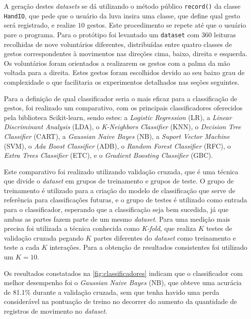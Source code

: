 A geração destes \textit{datasets} se dá utilizando o método público \texttt{record()} da classe \texttt{HandIO}, que pede que o usuário da luva insira uma classe, que define qual gesto será registrado, e realize $10$ gestos. Este procedimento se repete até que o usuário pare o programa. Para o protótipo foi levantado um \texttt{dataset} com $360$ leituras recolhidas de nove voluntários diferentes, distribuídas entre quatro classes de gestos correspondentes à movimentos nas direções cima, baixo, direita e esquerda. Os voluntários foram orientados a realizarem os gestos com a palma da mão voltada para a direita. Estes gestos foram escolhidos devido ao seu baixo grau de complexidade o que facilitaria os experimentos detalhados nas seções seguintes.

Para a definição de qual classificador seria o mais eficaz para a classificação de gestos, foi realizado um comparativo, com os principais classificadores oferecidos pela biblioteca Scikit-learn, sendo estes: a \textit{Logistic Regression} (LR), a \textit{Linear Discriminant Analysis} (LDA), o \textit{K-Neighbors Classifier} (KNN), o \textit{Decision Tree Classifier} (CART), a \textit{Gaussian Naive Bayes} (NB), a \textit{Suport Vector Machine} (SVM), o \textit{Ada Boost Classifier} (ADB), o \textit{Random Forest Classifier} (RFC), o \textit{Extra Trees Classifier} (ETC), e o \textit{Gradient Boosting Classifier} (GBC).

Este comparativo foi realizado utilizando validação cruzada, que é uma técnica que divide o \textit{dataset} em grupos de treinamento e grupos de teste. O grupo de treinamento é utilizado para a criação do modelo de classificação que serve de referência para classificações futuras, e o grupo de testes é utilizado como entrada para o classificador, esperando que a classificação seja bem sucedida, já que ambas as partes fazem parte de um mesmo \textit{dataset}. Para uma medição mais precisa foi utilizada a técnica conhecida como \textit{K-fold}, que realiza $K$ testes de validação cruzada pegando $K$ partes diferentes do \textit{dataset} como treinamento e teste a cada $K$ interações. Para a obtenção de resultados consistentes foi utilizado um $K = 10$.

Os resultados constatados na \autoref{fig:classificadores} indicam que o classificador com melhor desempenho foi o \textit{Gaussian Naive Bayes} (NB), que obteve uma acurácia de 81.1\% durante a validação cruzada, sem que tenha havido uma perda considerável na pontuação de treino no decorrer do aumento da quantidade de registros de movimento no \textit{dataset}. 

